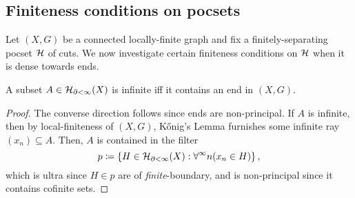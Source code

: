 \documentclass[reqno]{amsart}
\begin{document}
    \subsection{Finiteness conditions on pocsets}\label{sec:finiteness_conditions_on_pocsets_dense_cuts}

    Let $(X,G)$ be a connected locally-finite graph and fix a finitely-separating pocset $\mathcal{H}$ of cuts. We now investigate certain finiteness conditions on $\mathcal{H}$ when it is dense towards ends.

    \begin{lemma}\label{lem:infinite_iff_contains_end}
        A subset $A\in\mathcal{H}_{\partial<\infty}(X)$ is infinite iff it contains an end in $(X,G)$.
    \end{lemma}
    \begin{proof}
        The converse direction follows since ends are non-principal. If $A$ is infinite, then by local-finiteness of $(X,G)$, K\H{o}nig's Lemma furnishes some infinite ray $(x_n)\subseteq A$. Then, $A$ is contained in the filter
        \begin{equation*}
            p\coloneqq\left\{H\in\mathcal{H}_{\partial<\infty}(X):\forall^\infty n(x_n\in H)\right\},
        \end{equation*}
        which is ultra since $H\in p$ are of \textit{finite}-boundary, and is non-principal since it contains cofinite sets.
    \end{proof}
\end{document}
